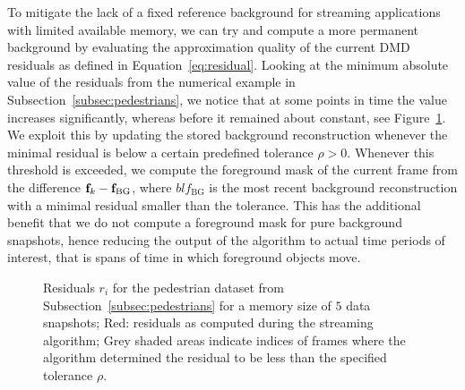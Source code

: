To mitigate the lack of a fixed reference background for streaming applications with limited available memory, we can try and compute a more permanent background by evaluating the approximation quality of the current DMD residuals as defined in Equation~\ref{eq:residual}. Looking at the minimum absolute value of the residuals from the numerical example in Subsection~\ref{subsec:pedestrians}, we notice that at some points in time the value increases significantly, whereas before it remained about constant, see Figure~\ref{fig:pedestrian-residual}. We exploit this by updating the stored background reconstruction whenever the minimal residual is below a certain predefined tolerance $\rho > 0$. Whenever this threshold is exceeded, we compute the foreground mask of the current frame from the difference $\mathbf{f}_k - \mathbf{f}_\text{BG}$, where $bl{f}_\text{BG}$ is the most recent background reconstruction with a minimal residual smaller than the tolerance. This has the additional benefit that we do not compute a foreground mask for pure background snapshots, hence reducing the output of the algorithm to actual time periods of interest, that is spans of time in which foreground objects move.

\begin{figure}[!ht]
    \centering
    \caption{Residuals $r_i$ for the pedestrian dataset from Subsection~\ref{subsec:pedestrians} for a memory size of $5$ data snapshots; Red: residuals as computed during the streaming algorithm; Grey shaded areas indicate indices of frames where the algorithm determined the residual to be less than the specified tolerance $\rho$.}\label{fig:pedestrian-residual}
\end{figure}

